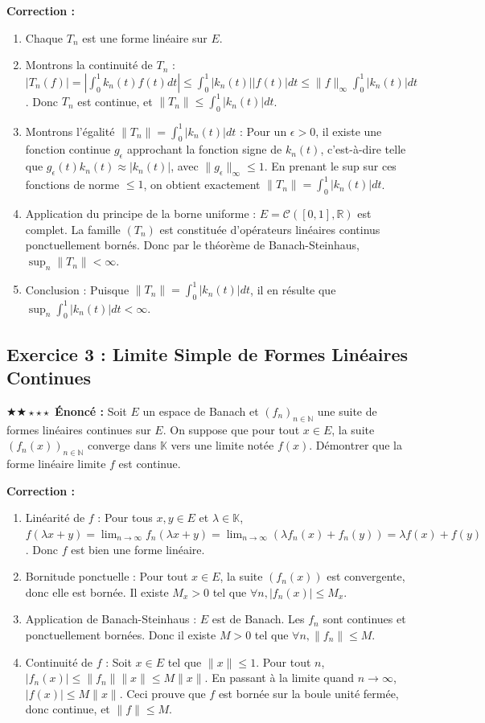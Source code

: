 \documentclass[11pt,a4paper]{article}
\begin{document}
\textbf{Correction :}
\begin{enumerate}
\item Chaque $T_n$ est une forme linéaire sur $E$.
\item Montrons la continuité de $T_n$ :
   $|T_n(f)| = \left| \int_0^1 k_n(t) f(t) dt \right| \le \int_0^1 |k_n(t)| |f(t)| dt \le \|f\|_{\infty} \int_0^1 |k_n(t)| dt$.
   Donc $T_n$ est continue, et $\|T_n\| \le \int_0^1 |k_n(t)| dt$.
\item Montrons l'égalité $\|T_n\| = \int_0^1 |k_n(t)| dt$ :
   Pour un $\epsilon > 0$, il existe une fonction continue $g_\epsilon$ approchant la fonction signe de $k_n(t)$, c'est-à-dire telle que $g_\epsilon(t) k_n(t) \approx |k_n(t)|$, avec $\|g_\epsilon\|_{\infty} \le 1$.
   En prenant le sup sur ces fonctions de norme $\le 1$, on obtient exactement $\|T_n\| = \int_0^1 |k_n(t)| dt$.
\item Application du principe de la borne uniforme :
   $E = \mathcal{C}([0,1], \mathbb{R})$ est complet. La famille $(T_n)$ est constituée d'opérateurs linéaires continus ponctuellement bornés.
   Donc par le théorème de Banach-Steinhaus, $\sup_n \|T_n\| < \infty$.
\item Conclusion :
   Puisque $\|T_n\| = \int_0^1 |k_n(t)| dt$, il en résulte que $\sup_n \int_0^1 |k_n(t)| dt < \infty$.
\end{enumerate}
\vspace{1cm}
\subsection*{Exercice 3 : Limite Simple de Formes Linéaires Continues}
$\bigstar\bigstar\star\star\star$
\textbf{Énoncé :}
Soit $E$ un espace de Banach et $(f_n)_{n \in \mathbb{N}}$ une suite de formes linéaires continues sur $E$.
On suppose que pour tout $x \in E$, la suite $(f_n(x))_{n \in \mathbb{N}}$ converge dans $\mathbb{K}$ vers une limite notée $f(x)$.
Démontrer que la forme linéaire limite $f$ est continue.

\textbf{Correction :}
\begin{enumerate}
\item Linéarité de $f$ :
   Pour tous $x, y \in E$ et $\lambda \in \mathbb{K}$,
   $f(\lambda x + y) = \lim_{n \to \infty} f_n(\lambda x + y) = \lim_{n \to \infty} (\lambda f_n(x) + f_n(y)) = \lambda f(x) + f(y)$.
   Donc $f$ est bien une forme linéaire.
\item Bornitude ponctuelle :
   Pour tout $x \in E$, la suite $(f_n(x))$ est convergente, donc elle est bornée.
   Il existe $M_x > 0$ tel que $\forall n, |f_n(x)| \le M_x$.
\item Application de Banach-Steinhaus :
   $E$ est de Banach. Les $f_n$ sont continues et ponctuellement bornées.
   Donc il existe $M > 0$ tel que $\forall n, \|f_n\| \le M$.
\item Continuité de $f$ :
   Soit $x \in E$ tel que $\|x\| \le 1$.
   Pour tout $n$, $|f_n(x)| \le \|f_n\| \|x\| \le M \|x\|$.
   En passant à la limite quand $n \to \infty$, $|f(x)| \le M \|x\|$.
   Ceci prouve que $f$ est bornée sur la boule unité fermée, donc continue, et $\|f\| \le M$.
\end{enumerate}
\vspace{1cm}
\end{document}
